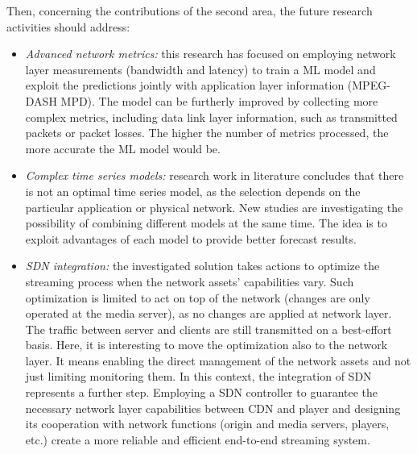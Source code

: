 Then, concerning the contributions of the second area, the future research activities should address:
\begin{itemize}
	\item \textit{Advanced network metrics:} this research has focused on employing network layer measurements (bandwidth and latency) to train a ML model and exploit the predictions jointly with application layer information (MPEG-DASH MPD). The model can be furtherly improved by collecting more complex metrics, including data link layer information, such as transmitted packets or packet losses. The higher the number of metrics processed, the more accurate the ML model would be.	
	\item \textit{Complex time series models:} research work in literature concludes that there is not an optimal time series model, as the selection depends on the particular application or physical network. New studies are investigating the possibility of combining different models at the same time. The idea is to exploit advantages of each model to provide better forecast results.
	\item \textit{SDN integration:} the investigated solution takes actions to optimize the streaming process when the network assets' capabilities vary. Such optimization is limited to act on top of the network (changes are only operated at the media server), as no changes are applied at network layer. The traffic between server and clients are still transmitted on a best-effort basis. Here, it is interesting to move the optimization also to the network layer. It means enabling the direct management of the network assets and not just limiting monitoring them. In this context, the integration of SDN represents a further step. Employing a SDN controller to guarantee the necessary network layer capabilities between CDN and player and designing its cooperation with network functions (origin and media servers, players, etc.) create a more reliable and efficient end-to-end streaming system.
\end{itemize}

